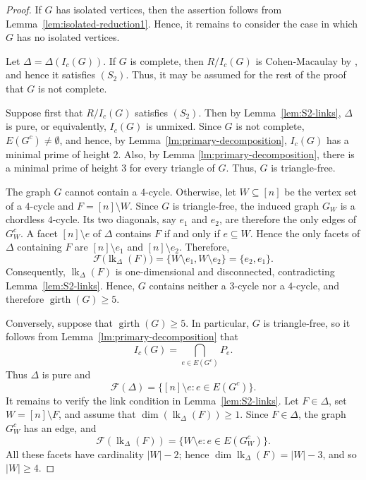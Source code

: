 \documentclass[12pt]{amsart}
\DeclareMathOperator{\lk}{lk}
\begin{document}
\begin{proof}
If $G$ has isolated vertices, then the assertion follows from Lemma~\ref{lem:isolated-reduction1}. Hence, it remains to consider the case in which $G$ has no isolated vertices.

Let \(\Delta=\Delta(I_c(G))\). If \(G\) is complete, then \(R/I_c(G)\) is Cohen-Macaulay by \cite[Theorem~2.8]{fm25}, and hence it satisfies \((S_2)\). Thus, it may be assumed for the rest of the proof that \(G\) is not complete.

Suppose first that \(R/I_c(G)\) satisfies \((S_2)\). Then by Lemma~\ref{lem:S2-links}, \(\Delta\) is pure, or equivalently, \(I_c(G)\) is unmixed. Since \(G\) is not complete, \(E(G^c)\ne\emptyset\), and hence, by Lemma~\ref{lm:primary-decomposition}, \(I_c(G)\) has a minimal prime of height \(2\). Also, by Lemma \ref{lm:primary-decomposition}, there is a minimal prime of height \(3\) for every triangle of \(G\). Thus, \(G\) is triangle-free.

The graph \(G\) cannot contain a \(4\)-cycle. Otherwise, let \(W\subseteq[n]\) be the vertex set of a \(4\)-cycle and \(F=[n]\setminus W\). Since \(G\) is triangle-free, the induced graph \(G_W\) is a chordless \(4\)-cycle. Its two diagonals, say \(e_1\) and \(e_2\), are therefore the only edges of \(G_W^c\). 
A facet \([n]\setminus e\) of \(\Delta\) contains \(F\) if and only if
\(e\subseteq W\). Hence the only facets of \(\Delta\) containing \(F\)
are \([n]\setminus e_1\) and \([n]\setminus e_2\). Therefore,
\[
\mathcal F\bigl(\lk_\Delta(F)\bigr)
=
\{W\setminus e_1,W\setminus e_2\}
=
\{e_2,e_1\}.
\]
Consequently, \(\lk_\Delta(F)\) is one-dimensional and disconnected, contradicting Lemma~\ref{lem:S2-links}. Hence, \(G\) contains neither a \(3\)-cycle nor a \(4\)-cycle, and therefore \(\operatorname{girth}(G)\ge5\).

Conversely, suppose that \(\operatorname{girth}(G)\ge5\). In particular, \(G\) is triangle-free, so it follows from Lemma~\ref{lm:primary-decomposition} that
\[
I_c(G)=\bigcap_{e\in E(G^c)}P_e.
\]
Thus \(\Delta\) is pure and
\[
\mathcal F(\Delta)=\{[n]\setminus e:e\in E(G^c)\}.
\]
It remains to verify the link condition in Lemma~\ref{lem:S2-links}. Let \(F\in\Delta\), set \(W=[n]\setminus F\), and assume that \(\dim(\lk_\Delta(F))\ge1\). Since \(F\in\Delta\), the graph \(G_W^c\) has an edge, and
\begin{equation}\label{eq:facets-S2-link}
\mathcal F(\lk_\Delta(F))=\{W\setminus e:e\in E(G_W^c)\}.
\end{equation}
All these facets have cardinality \(|W|-2\); hence \(\dim\lk_\Delta(F)=|W|-3\), and so \(|W|\ge4\).


\end{proof}
\end{document}
